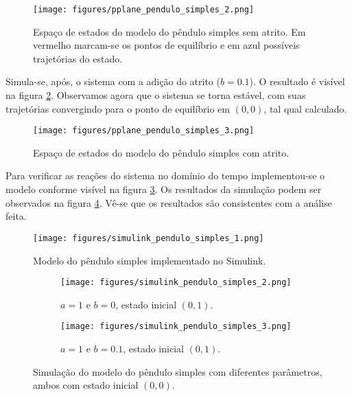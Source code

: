 \documentclass[a4paper]{report}
\begin{document}
\begin{figure}[h]
    \centering
    \texttt{[image: figures/pplane\_pendulo\_simples\_2.png]}
    \caption{Espaço de estados do modelo do pêndulo simples sem atrito. Em vermelho marcam-se os pontos de equilíbrio e em azul possíveis trajetórias do estado.}
    \label{fig:figures-pplane_pendulo_simples_2-png}
\end{figure}

Simula-se, após, o sistema com a adição do atrito ($b=0.1$). O resultado é visível na figura \ref{fig:figures-pplane_pendulo_simples_3-png}. Observamos agora que o sistema se torna estável, com suas trajetórias convergindo para o ponto de equilíbrio em $(0,0)$, tal qual calculado.

\begin{figure}[H]
    \centering
    \texttt{[image: figures/pplane\_pendulo\_simples\_3.png]}
    \caption{Espaço de estados do modelo do pêndulo simples com atrito.}
    \label{fig:figures-pplane_pendulo_simples_3-png}
\end{figure}

Para verificar as reações do sistema no domínio do tempo implementou-se o modelo conforme visível na figura \ref{fig:figures-simulink_pendulo_simples_1-png}. Os resultados da simulação podem ser observados na figura \ref{fig:figures-simulink_pendulo_simples_2-png}. Vê-se que os resultados são consistentes com a análise feita.

\begin{figure}[H]
    \centering
    \texttt{[image: figures/simulink\_pendulo\_simples\_1.png]}
    \caption{Modelo do pêndulo simples implementado no Simulink.}
    \label{fig:figures-simulink_pendulo_simples_1-png}
\end{figure}

\begin{figure}[H]
    \centering
    \begin{subfigure}{0.45\textwidth}
	\texttt{[image: figures/simulink\_pendulo\_simples\_2.png]}
	\caption{$a=1$ e $b=0$, estado inicial $(0,1)$.}
    \end{subfigure}
    \begin{subfigure}{0.45\textwidth}
	\texttt{[image: figures/simulink\_pendulo\_simples\_3.png]}
	\caption{$a=1$ e $b=0.1$, estado inicial $(0,1)$.}
    \end{subfigure}
    \caption{Simulação do modelo do pêndulo simples com diferentes parâmetros, ambos com estado inicial $(0,0)$.}
    \label{fig:figures-simulink_pendulo_simples_2-png}
\end{figure}
\end{document}

